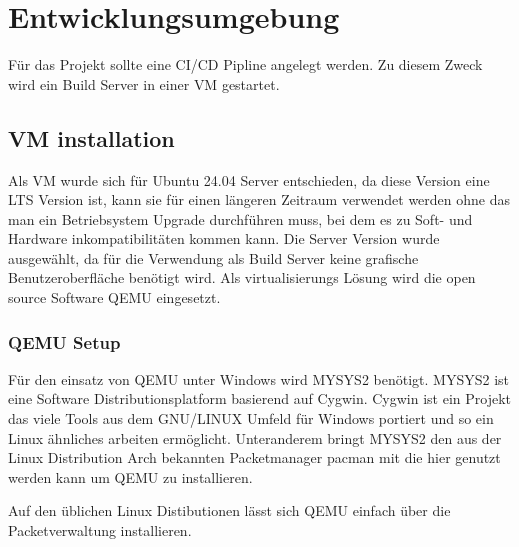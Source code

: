 \chapter{Entwicklungsumgebung}

Für das Projekt sollte eine \acf{CI/CD} Pipline angelegt werden. Zu diesem Zweck wird ein Build Server in einer \acf{VM} gestartet.

\section{\ac{VM} installation}

Als \ac{VM} wurde sich für Ubuntu 24.04 Server entschieden, da diese Version eine \acf{LTS} Version ist, kann sie für einen längeren Zeitraum verwendet werden ohne das man ein Betriebsystem Upgrade durchführen muss, bei dem es zu Soft- und Hardware inkompatibilitäten kommen kann. Die Server Version wurde ausgewählt, da für die Verwendung als Build Server keine grafische Benutzeroberfläche benötigt wird. Als virtualisierungs Lösung wird die open source Software QEMU eingesetzt.

\subsection{QEMU Setup}

Für den einsatz von QEMU unter Windows wird MYSYS2 benötigt. MYSYS2 ist eine Software Distributionsplatform basierend auf Cygwin. Cygwin ist ein Projekt das viele Tools aus dem GNU/LINUX Umfeld für Windows portiert und so ein Linux ähnliches arbeiten ermöglicht. Unteranderem bringt MYSYS2 den aus der Linux Distribution Arch bekannten Packetmanager pacman mit die hier genutzt werden kann um QEMU zu installieren.
 
Auf den üblichen Linux Distibutionen lässt sich QEMU einfach über die Packetverwaltung installieren.

